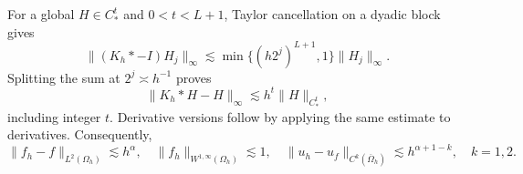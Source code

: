 \documentclass[11pt]{article}
\theoremstyle{remark}
\newcommand{\norm}[1]{\lVert #1\rVert}
\begin{document}
For a global $H\in C_*^t$ and $0<t<L+1$, Taylor cancellation on a dyadic block gives
\[
 \norm{(K_h*-I)H_j}_\infty
 \lesssim\min\{(h2^j)^{L+1},1\}\norm{H_j}_\infty.
\]
Splitting the sum at $2^j\asymp h^{-1}$ proves
\begin{equation}\label{eq:smoothing}
 \norm{K_h*H-H}_\infty\lesssim h^t\norm{H}_{C_*^t},
\end{equation}
including integer $t$. Derivative versions follow by applying the same estimate to derivatives. Consequently,
\begin{equation}\label{eq:smoothfu}
 \norm{f_h-f}_{L^2(\Omega_h)}\lesssim h^\alpha,
 \quad \norm{f_h}_{W^{1,\infty}(\Omega_h)}\lesssim1,
 \quad \norm{u_h-u_f}_{C^k(\overline\Omega_h)}
 \lesssim h^{\alpha+1-k},\quad k=1,2.
\end{equation}
\end{document}
